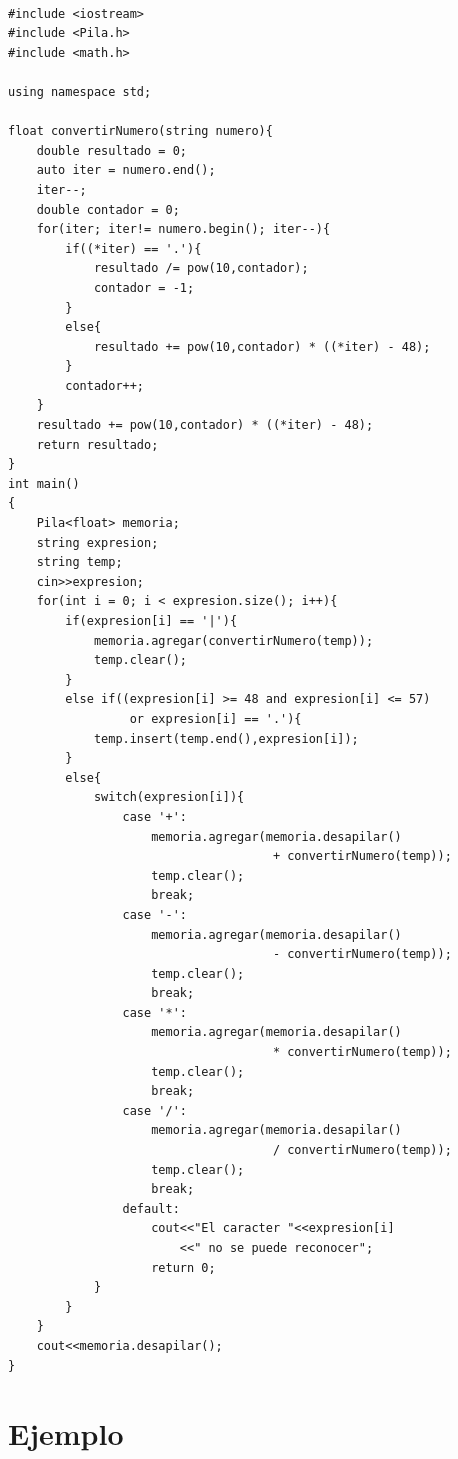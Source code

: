 \documentclass[a4paper,12pt]{article}
\begin{document}
\begin{lstlisting}

#include <iostream>
#include <Pila.h>
#include <math.h>

using namespace std;

float convertirNumero(string numero){
    double resultado = 0;
    auto iter = numero.end();
    iter--;
    double contador = 0;
    for(iter; iter!= numero.begin(); iter--){
        if((*iter) == '.'){
            resultado /= pow(10,contador);
            contador = -1;
        }
        else{
            resultado += pow(10,contador) * ((*iter) - 48);
        }
        contador++;
    }
    resultado += pow(10,contador) * ((*iter) - 48);
    return resultado;
}
int main()
{
    Pila<float> memoria;
    string expresion;
    string temp;
    cin>>expresion;
    for(int i = 0; i < expresion.size(); i++){
        if(expresion[i] == '|'){
            memoria.agregar(convertirNumero(temp));
            temp.clear();
        }
        else if((expresion[i] >= 48 and expresion[i] <= 57)
                 or expresion[i] == '.'){
            temp.insert(temp.end(),expresion[i]);
        }
        else{
            switch(expresion[i]){
                case '+':
                    memoria.agregar(memoria.desapilar()
                                     + convertirNumero(temp));
                    temp.clear();
                    break;
                case '-':
                    memoria.agregar(memoria.desapilar()
                                     - convertirNumero(temp));
                    temp.clear();
                    break;
                case '*':
                    memoria.agregar(memoria.desapilar()
                                     * convertirNumero(temp));
                    temp.clear();
                    break;
                case '/':
                    memoria.agregar(memoria.desapilar()
                                     / convertirNumero(temp));
                    temp.clear();
                    break;
                default:
                    cout<<"El caracter "<<expresion[i]
                        <<" no se puede reconocer";
                    return 0;
            }
        }
    }
    cout<<memoria.desapilar();
}

\end{lstlisting}

\onecolumn

\section{Ejemplo}
\end{document}
